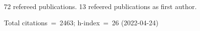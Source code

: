 72 refereed publications. 13 refeered publications as first author.

Total citations~=~2463; h-index~=~26 (2022-04-24)